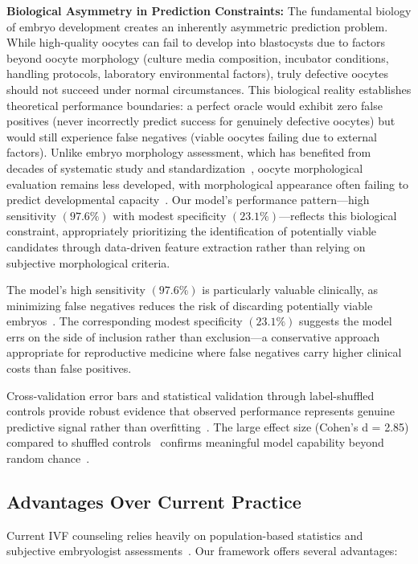 \documentclass[pdflatex,sn-basic]{sn-jnl}%
\begin{document}
\textbf{Biological Asymmetry in Prediction Constraints:} The fundamental biology of embryo development creates an inherently asymmetric prediction problem. While high-quality oocytes can fail to develop into blastocysts due to factors beyond oocyte morphology (culture media composition, incubator conditions, handling protocols, laboratory environmental factors), truly defective oocytes should not succeed under normal circumstances. This biological reality establishes theoretical performance boundaries: a perfect oracle would exhibit zero false positives (never incorrectly predict success for genuinely defective oocytes) but would still experience false negatives (viable oocytes failing due to external factors). Unlike embryo morphology assessment, which has benefited from decades of systematic study and standardization~\cite{racowsky2010standardization}, oocyte morphological evaluation remains less developed, with morphological appearance often failing to predict developmental capacity~\cite{reader2022high}. Our model's performance pattern—high sensitivity $(97.6\%)$ with modest specificity $(23.1\%)$—reflects this biological constraint, appropriately prioritizing the identification of potentially viable candidates through data-driven feature extraction rather than relying on subjective morphological criteria.

The model's high sensitivity $(97.6\%)$ is particularly valuable clinically, as minimizing false negatives reduces the risk of discarding potentially viable embryos~\cite{cutting2008elective}. The corresponding modest specificity $(23.1\%)$ suggests the model errs on the side of inclusion rather than exclusion—a conservative approach appropriate for reproductive medicine where false negatives carry higher clinical costs than false positives.

Cross-validation error bars and statistical validation through label-shuffled controls provide robust evidence that observed performance represents genuine predictive signal rather than overfitting~\cite{hastie2009elements}. The large effect size (Cohen's d = 2.85) compared to shuffled controls~\cite{cohen1988statistical} confirms meaningful model capability beyond random chance~\cite{mann1947test}.

\subsection{Advantages Over Current Practice}

Current IVF counseling relies heavily on population-based statistics and subjective embryologist assessments~\cite{asrm2017embryo,racowsky2010standardization}. Our framework offers several advantages:
\end{document}
